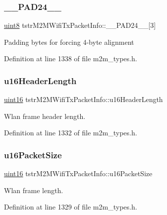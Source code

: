 \subsubsection{\texorpdfstring{\+\_\+\+\_\+\+P\+A\+D24\+\_\+\+\_\+}{\_\_PAD24\_\_}}
{\footnotesize\ttfamily \hyperlink{group__DataT_ga4df709a77647e870bbf1d955b8edc9a6}{uint8} tstr\+M2\+M\+Wifi\+Tx\+Packet\+Info\+::\+\_\+\+\_\+\+P\+A\+D24\+\_\+\+\_\+\mbox{[}3\mbox{]}}

Padding bytes for forcing 4-\/byte alignment 

Definition at line 1338 of file m2m\+\_\+types.\+h.

\mbox{\label{structtstrM2MWifiTxPacketInfo_a6890b3d90c9578aa3ecaa545fabe5860}} 
\subsubsection{\texorpdfstring{u16\+Header\+Length}{u16HeaderLength}}
{\footnotesize\ttfamily \hyperlink{group__DataT_ga1daa745171fc6e31d942c161422a76f9}{uint16} tstr\+M2\+M\+Wifi\+Tx\+Packet\+Info\+::u16\+Header\+Length}

Wlan frame header length. 

Definition at line 1332 of file m2m\+\_\+types.\+h.

\mbox{\label{structtstrM2MWifiTxPacketInfo_a4cd9dd241fe12bc078100cebf1298e20}} 
\subsubsection{\texorpdfstring{u16\+Packet\+Size}{u16PacketSize}}
{\footnotesize\ttfamily \hyperlink{group__DataT_ga1daa745171fc6e31d942c161422a76f9}{uint16} tstr\+M2\+M\+Wifi\+Tx\+Packet\+Info\+::u16\+Packet\+Size}

Wlan frame length. 

Definition at line 1329 of file m2m\+\_\+types.\+h.

